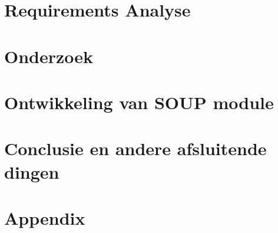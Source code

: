 \part{Requirements Analyse}\label{prt:Requirements}



\ctparttext{}
\part{Onderzoek}\label{prt:Onderzoek} %







 \ctparttext{}
 \part{Ontwikkeling van SOUP module}\label{prt:Impolementatie}
 
 
 
 
 
 
 

 \ctparttext{}

 \part{Conclusie en andere afsluitende dingen}\label{prt:Conclussie}
 
 

\cleardoublepage %


\ctparttext{}


\cleardoublepage %


\appendix
%

\part{Appendix}\label{prt:Appendix} %
%






